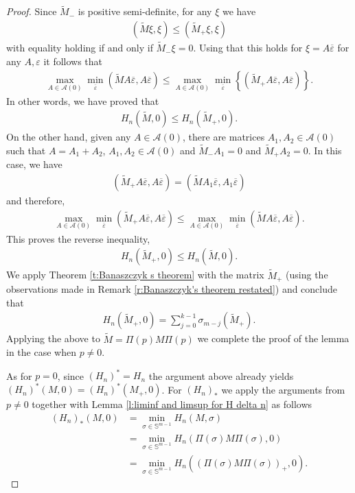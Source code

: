 \documentclass[reqno]{amsart}
\numberwithin{equation}{section}
\begin{document}
\begin{proof}
  
  Since $\tilde M_-$ is positive semi-definite, for any $\xi$ we have
  \begin{align*}
    (\tilde M\xi,\xi) \leq (\tilde M_+\xi,\xi)    
  \end{align*}
  with equality holding if and only if $\tilde M_-\xi = 0$. Using that this holds for $\xi = A\overline \varepsilon$ for any $A,\varepsilon$ it follows that 
  \begin{align*}
    \max_{A\in\mathcal{A}(0)}\min_{\overline \varepsilon} (\tilde M A\overline \varepsilon,A\overline \varepsilon) \leq \max_{A\in\mathcal{A}(0)}\min_{\overline \varepsilon}\left \{ (\tilde M_+A\overline \varepsilon,A \overline \varepsilon) \right \}.
  \end{align*}
  In other words, we have proved that
  \begin{align*}
    H_n(\tilde M,0) \leq H_n(\tilde M_+,0).    
  \end{align*}
  On the other hand, given any $A \in \mathcal{A}(0)$,  there are matrices $A_1,A_2\in\mathcal{A}(0)$ such that $A = A_1+A_2$, $A_1,A_2 \in \mathcal{A}(0)$ and $\tilde M_-A_1=0$ and $\tilde M_+A_2 = 0$. In this case, we have
  \begin{align*}
    (\tilde M_+A\overline\varepsilon,A\overline\varepsilon) = (\tilde M A_1\overline \varepsilon,A_1\overline \varepsilon) 
  \end{align*}
  and therefore, 
  \begin{align*}
    \max_{A\in\mathcal{A}(0)}\min_{\overline\varepsilon}(\tilde M_+A\overline\varepsilon,A\overline \varepsilon) \leq \max_{A\in\mathcal{A}(0)}\min_{\overline\varepsilon}(\tilde MA\overline\varepsilon,A\overline \varepsilon).   
  \end{align*}
  This proves the reverse inequality, 
  \begin{align*}
    H_n(\tilde M_+,0)\leq H_n(\tilde M,0).    
  \end{align*}
  We apply Theorem \ref{t:Banaszczyk s theorem} with the matrix $\tilde M_+$ (using the observations made in Remark \ref{r:Banaszczyk's theorem restated}) and conclude that 
  \begin{align*}
    H_n(\tilde M_+,0) = \sum \limits_{j=0}^{k-1}\sigma_{m-j}(\tilde M_+).
  \end{align*}
  Applying the above to $\tilde M = \Pi(p)M\Pi(p)$ we complete the proof of the lemma in the case when $p\neq 0$.
  
  As for $p=0$, since $(H_n)^* = H_n$ the argument above already yields $(H_n)^*(M,0) = (H_n)^*(M_+,0)$. For $(H_n)_*$ we apply the arguments from $p\neq 0$ together with Lemma \ref{l:liminf and limsup for H delta n} as follows
  \begin{align*}
    (H_n)_*(M,0) & = \min_{\sigma \in \mathbb{S}^{m-1}}H_n(M,\sigma)\\
    & = \min_{\sigma \in \mathbb{S}^{m-1}}H_n(\Pi(\sigma)M\Pi(\sigma),0)\\
    & = \min_{\sigma \in \mathbb{S}^{m-1}}H_n((\Pi(\sigma)M\Pi(\sigma))_+,0).
  \end{align*}
\end{proof}
\end{document}
